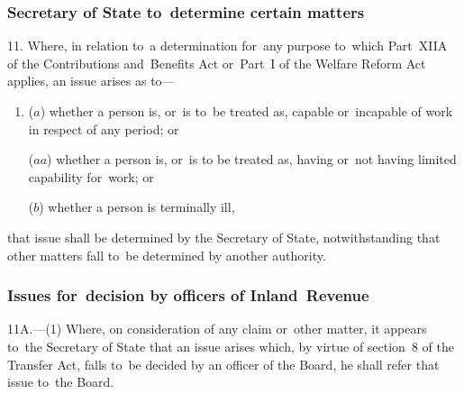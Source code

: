 \documentclass[12pt,a4paper]{article}
\begin{document}
\subsubsection[11. Secretary of State to~determine certain matters]{Secretary of State to~determine certain matters}

11.  Where, in relation to~a determination for~any purpose to~which Part~XIIA of the Contributions and~Benefits Act 
or~Part~I of the Welfare Reform Act  %
applies, an issue arises as to—
\begin{enumerate}\item[]
($a$) whether a person is, or~is to~be treated as, capable or~incapable of work in respect of any period; or

($aa$) whether a person is, or~is to be treated as, having or~not having limited capability for~work; or

($b$) whether a person is terminally ill,
\end{enumerate}
that issue shall be determined by the Secretary of State, notwithstanding that other matters fall to~be determined by another authority.


\subsubsection[11A. Issues for~decision by officers of Inland~Revenue]{Issues for~decision by officers of Inland~Revenue}

11A.---(1)  Where, on consideration of any claim or~other matter, it appears to~the Secretary of State that an issue arises which, by virtue of section~8 of the Transfer Act, falls to~be decided by an officer of the Board, he shall refer that issue to~the Board.
\end{document}
